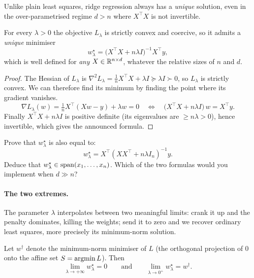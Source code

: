Unlike plain least squares, ridge regression
always has a \emph{unique} solution, even in the over-parametrised regime $d > n$
where $X^\top X$ is not invertible.

\begin{prop}
For every $\lambda > 0$ the objective $L_\lambda$ is strictly convex and coercive, so
it admits a \emph{unique} minimiser
\[
w^\star_\lambda = \big( X^\top X + n\lambda I \big)^{-1} X^\top y ,
\]
which is well defined for \emph{any} $X \in \mathbb{R}^{n \times d}$, whatever the relative
sizes of $n$ and $d$.
\end{prop}

\begin{proof}
The Hessian of $L_\lambda$ is $\nabla^2 L_\lambda = \tfrac{1}{n} X^\top X + \lambda I
\succeq \lambda I \succ 0$, so $L_\lambda$ is strictly convex. We can therefore find its minimum by finding the point where its gradient vanishes.
\[
\nabla L_\lambda(w) = \tfrac{1}{n} X^\top (X w - y) + \lambda w = 0
\quad \Longleftrightarrow \quad
\big( X^\top X + n\lambda I \big)\, w = X^\top y .
\]
Finally $X^\top X + n\lambda I$ is positive definite (its eigenvalues are $\geq
n\lambda > 0$), hence invertible, which gives the announced formula.
\end{proof}


\begin{exercise}[$\star$]
Prove that $w^\star_\lambda$ is also equal to:
\[
w^\star_\lambda = X^\top (X X^\top + n \lambda I_n)^{-1} y.
\]
Deduce that $w^\star_\lambda \in \operatorname{span}(x_1, \dots, x_n)$.
Which of the two formulas would you implement when $d \gg n$?
\end{exercise}

\paragraph{The two extremes.}
The parameter $\lambda$ interpolates between two meaningful limits: crank it up and
the penalty dominates, killing the weights; send it to zero and we recover ordinary
least squares, more precisely its minimum-norm solution.

\begin{prop}
Let $w^\dagger$ denote the minimum-norm minimiser of $L$ (the orthogonal projection
of $0$ onto the affine set $S = \operatorname*{argmin} L$). Then
\[
\lim_{\lambda \to +\infty} w^\star_\lambda = 0
\qquad \text{and} \qquad
\lim_{\lambda \to 0^+} w^\star_\lambda = w^\dagger .
\]
\end{prop}

